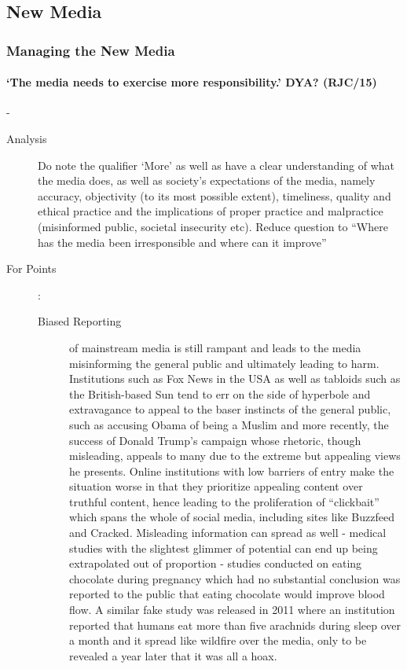 \documentclass[../../main]{subfiles}
\begin{document}
\subsection{New Media}

\subsubsection{Managing the New Media}

\paragraph{`The media needs to exercise more responsibility.' DYA? (RJC/15)}-

\begin{description}
	\item[Analysis] Do note the qualifier `More' as well as have a clear understanding of what the media does, as well as society's expectations of the media, namely accuracy, objectivity (to its most possible extent), timeliness, quality and ethical practice and the implications of proper practice and malpractice (misinformed public, societal insecurity etc). Reduce question to ``Where has the media been irresponsible and where can it improve''
	\item[For Points] :
		\begin{description}
			\item[Biased Reporting] of mainstream media is still rampant and leads to the media misinforming the general public and ultimately leading to harm. Institutions such as Fox News in the USA as well as tabloids such as the British-based Sun tend to err on the side of hyperbole and extravagance to appeal to the baser instincts of the general public, such as accusing Obama of being a Muslim and more recently, the success of Donald Trump's campaign whose rhetoric, though misleading, appeals to many due to the extreme but appealing views he presents. Online institutions with low barriers of entry make the situation worse in that they prioritize appealing content over truthful content, hence leading to the proliferation of ``clickbait'' which spans the whole of social media, including sites like Buzzfeed and Cracked. Misleading information can spread as well - medical studies with the slightest glimmer of potential can end up being extrapolated out of proportion - studies conducted on eating chocolate during pregnancy which had no substantial conclusion was reported to the public that eating chocolate would improve blood flow. A similar fake study was released in 2011 where an institution reported that humans eat more than five arachnids during sleep over a month and it spread like wildfire over the media, only to be revealed a year later that it was all a hoax.

\end{description}
\end{description}
\end{document}
